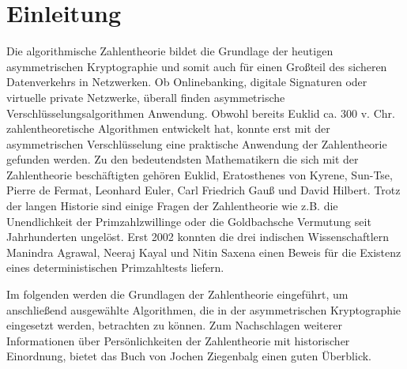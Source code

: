 \section{Einleitung}
	Die algorithmische Zahlentheorie bildet die Grundlage der heutigen asymmetrischen Kryptographie und somit auch für einen Großteil des sicheren Datenverkehrs in Netzwerken. Ob Onlinebanking, digitale Signaturen oder virtuelle private Netzwerke, überall finden asymmetrische Verschlüsselungsalgorithmen Anwendung. Obwohl bereits Euklid ca. 300 v. Chr. zahlentheoretische Algorithmen entwickelt hat, konnte erst mit der asymmetrischen Verschlüsselung eine praktische Anwendung der Zahlentheorie gefunden werden. Zu den bedeutendsten Mathematikern die sich mit der Zahlentheorie beschäftigten gehören Euklid, Eratosthenes von Kyrene, Sun-Tse, Pierre de Fermat, Leonhard Euler, Carl Friedrich Gauß und David Hilbert. Trotz der langen Historie sind einige Fragen der Zahlentheorie wie z.B. die Unendlichkeit der Primzahlzwillinge oder die Goldbachsche Vermutung seit Jahrhunderten ungelöst. Erst 2002 konnten die drei indischen Wissenschaftlern Manindra Agrawal, Neeraj Kayal und Nitin Saxena einen Beweis für die Existenz eines deterministischen Primzahltests liefern.
	
	Im folgenden werden die Grundlagen der Zahlentheorie eingeführt, um anschließend ausgewählte Algorithmen, die in der asymmetrischen Kryptographie eingesetzt werden, betrachten zu können. Zum Nachschlagen weiterer Informationen über Persönlichkeiten der Zahlentheorie mit historischer Einordnung, bietet das Buch \cite{Elementare:Zahlentheorie} von Jochen Ziegenbalg einen guten Überblick.